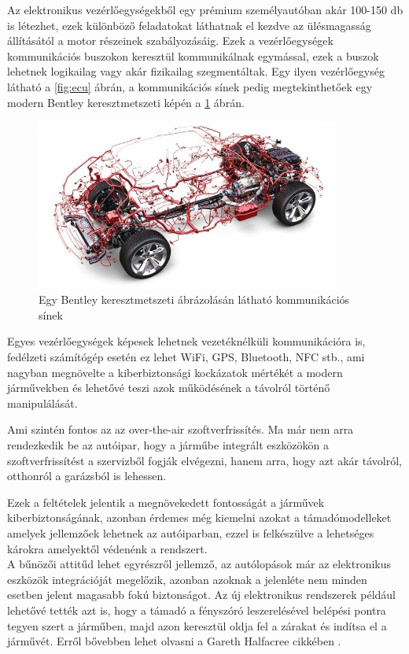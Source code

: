 Az elektronikus vezérlőegységekből egy prémium személyautóban akár 100-150 db is létezhet, ezek különböző feladatokat láthatnak el kezdve az ülésmagasság állításától a motor részeinek szabályozásáig. Ezek a vezérlőegységek kommunikációs buszokon keresztül kommunikálnak egymással, ezek a buszok lehetnek logikailag vagy akár fizikailag szegmentáltak. Egy ilyen vezérlőegység látható a \ref{fig:ecu} ábrán, a kommunikációs sínek pedig megtekinthetőek egy modern Bentley keresztmetszeti képén a \ref{fig:bentley} ábrán.\\

\begin{figure}[!ht]
	\centering
	\includegraphics[width=100mm, keepaspectratio]{figures/bentley.jpg}
	\caption{Egy Bentley keresztmetszeti ábrázolásán látható kommunikációs sínek\cite{bentley}}
	\label{fig:bentley}
\end{figure}

Egyes vezérlőegységek képesek lehetnek vezetéknélküli kommunikációra is, fedélzeti számítógép esetén ez lehet WiFi, GPS, Bluetooth, NFC stb., ami nagyban megnövelte a kiberbiztonsági kockázatok mértékét a modern járművekben és lehetővé teszi azok működésének a távolról történő manipulálását. 

Ami szintén fontos az az over-the-air szoftverfrissítés. Ma már nem arra rendezkedik be az autóipar, hogy a járműbe integrált eszközökön a szoftverfrissítést a szervizből fogják elvégezni, hanem arra, hogy azt akár távolról, otthonról a garázsból is lehessen.

Ezek a feltételek jelentik a megnövekedett fontosságát a járművek kiberbiztonságának, azonban érdemes még kiemelni azokat a támadómodelleket amelyek jellemzőek lehetnek az autóiparban, ezzel is felkészülve a lehetséges károkra amelyektől védenénk a rendszert.\\

A bűnözői attitűd lehet egyrészről jellemző, az autólopások már az elektronikus eszközök integrációját megelőzik, azonban azoknak a jelenléte nem minden esetben jelent magasabb fokú biztonságot. Az új elektronikus rendszerek például lehetővé tették azt is, hogy a támadó a fényszóró leszerelésével belépési pontra tegyen szert a járműben, majd azon keresztül oldja fel a zárakat és indítsa el a járművét. Erről bővebben lehet olvasni a Gareth Halfacree cikkében \cite{toyota}.


